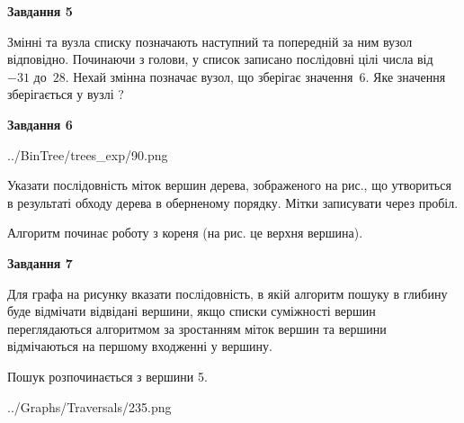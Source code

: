 \documentclass[12pt, ukrainian]{article}
\begin{document}
{\begin {large}
{\begin {center}\textbf{Завдання 5}\end {center}}\par
Змінні  та  вузла списку позначають наступний та попередній за ним вузол відповідно. Починаючи з голови, у список записано послідовні цілі числа від~$-31$ до~$28$. Нехай змінна  позначає вузол, що зберігає значення~$6$.
Яке значення зберігається у вузлі  ?\par
\newpage

{\begin {center}\textbf{Завдання 6}\end {center}}\par

\begin{center}
	{../BinTree/trees_exp/90.png}
\end{center}
Указати послідовність міток вершин дерева, зображеного на рис., що утвориться в результаті обходу дерева в оберненому порядку. Мітки записувати через пробіл.\par Алгоритм починає роботу з кореня (на рис. це верхня вершина).\par
\newpage

{\begin {center}\textbf{Завдання 7}\end {center}}\par
Для графа на рисунку вказати послідовність, в якій алгоритм пошуку в глибину буде відмічати відвідані вершини, якщо списки суміжності вершин переглядаються алгоритмом за зростанням міток вершин та вершини відмічаються на першому вход\-женні у вершину.\par
Пошук розпочинається з вершини 5.\par

\begin{center}
	{../Graphs/Traversals/235.png}
\end{center}\par
\newpage


\end{large}}
\end{document}
